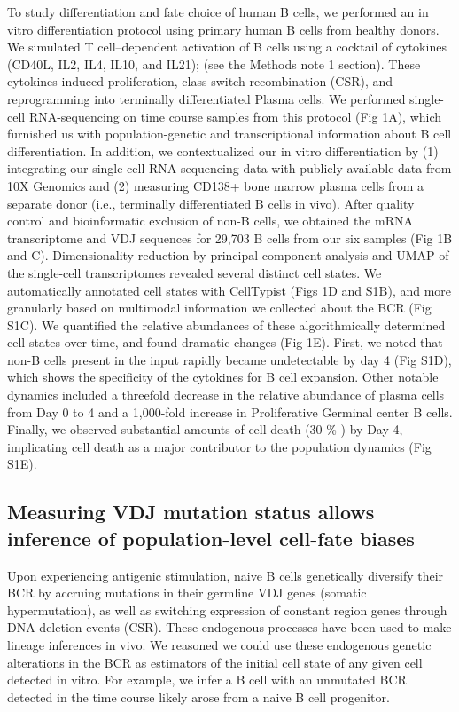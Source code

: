 To study differentiation and fate choice of human B cells, we performed an in vitro differentiation protocol using primary human B cells from healthy donors. We simulated T cell–dependent activation of B cells using a cocktail of cytokines (CD40L, IL2, IL4, IL10, and IL21); (see the Methods note 1 section). These cytokines induced proliferation, class-switch recombination (CSR), and reprogramming into terminally differentiated Plasma cells. We performed single-cell RNA-sequencing on time course samples from this protocol (Fig 1A), which furnished us with population-genetic and transcriptional information about B cell differentiation. In addition, we contextualized our in vitro differentiation by (1) integrating our single-cell RNA-sequencing data with publicly available data from 10X Genomics and (2) measuring CD138+ bone marrow plasma cells from a separate donor (i.e., terminally differentiated B cells in vivo). After quality control and bioinformatic exclusion of non-B cells, we obtained the mRNA transcriptome and VDJ sequences for 29,703 B cells from our six samples (Fig 1B and C).
Dimensionality reduction by principal component analysis and UMAP\cite{mcinnes_umap_2018} of the single-cell transcriptomes revealed several distinct cell states. We automatically annotated cell states with CellTypist (Figs 1D and S1B)\cite{dominguez_conde_cross-tissue_2022}, and more granularly based on multimodal information we collected about the BCR (Fig S1C). We quantified the relative abundances of these algorithmically determined cell states over time, and found dramatic changes (Fig 1E). First, we noted that non-B cells present in the input rapidly became undetectable by day 4 (Fig S1D), which shows the specificity of the cytokines for B cell expansion. Other notable dynamics included a threefold decrease in the relative abundance of plasma cells from Day 0 to 4 and a 1,000-fold increase in Proliferative Germinal center B cells. Finally, we observed substantial amounts of cell death (30 \% ) by Day 4, implicating cell death as a major contributor to the population dynamics (Fig S1E).


\subsection{Measuring VDJ mutation status allows inference of population-level cell-fate biases}

Upon experiencing antigenic stimulation, naive B cells genetically diversify their BCR by accruing mutations in their germline VDJ genes (somatic hypermutation), as well as switching expression of constant region genes through DNA deletion events (CSR). These endogenous processes have been used to make lineage inferences in vivo\cite{horns_lineage_2016}. We reasoned we could use these endogenous genetic alterations in the BCR as estimators of the initial cell state of any given cell detected in vitro. For example, we infer a B cell with an unmutated BCR detected in the time course likely arose from a naive B cell progenitor.

